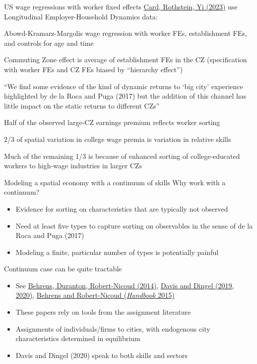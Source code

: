 \documentclass[11pt,notes=hide,aspectratio=169]{beamer}
\begin{document}
\begin{frame}{US wage regressions with worker fixed effects}
\href{https://www.nber.org/papers/w31587}{Card, Rothstein, Yi (2023)}
use Longitudinal Employer-Household Dynamics data:
\begin{itemize}{
\item Abowd-Kramarz-Margolis wage regression with worker FEs, establishment FEs, and controls for age and time
\item Commuting Zone effect is average of establishment FEs in the CZ
(specification with worker FEs and CZ FEs biased by ``hierarchy effect'')
\item {\small ``We find some evidence of the kind of dynamic returns to `big city' experience highlighted by de la Roca and Puga (2017) but the addition of this channel has little impact on the static returns to different CZs''\par}
\item Half of the observed large-CZ earnings premium reflects worker sorting
\item 2/3 of spatial variation in college wage premia is variation in relative skills
\item Much of the remaining 1/3 is because of enhanced sorting of college-educated workers to high-wage industries in larger CZs
}\end{itemize}
\end{frame}
\begin{frame}{Modeling a spatial economy with a continuum of skills}
Why work with a continuum?
\begin{itemize}
	\item Evidence for sorting on characteristics that are typically not observed
	\item Need at least five types to capture sorting on observables in the sense of de la Roca and Puga (2017)
	\item Modeling a finite, particular number of types is potentially painful
\end{itemize}
Continuum case can be quite tractable
\begin{itemize}
	\item See \href{https://ideas.repec.org/a/ucp/jpolec/doi10.1086-675534.html}{Behrens, Duranton, Robert-Nicoud (2014)}, \href{http://www.jdingel.com}{Davis and Dingel (2019, 2020)}, \href{http://www.sciencedirect.com/science/article/pii/B9780444595171000040}{Behrens and Robert-Nicoud (\emph{Handbook} 2015)}
	\item These papers rely on tools from the assignment literature
	\item Assignments of individuals/firms to cities, with endogenous city characteristics determined in equilibrium
	\item Davis and Dingel (2020) speak to both skills and sectors
\end{itemize}
\end{frame}
\end{document}
